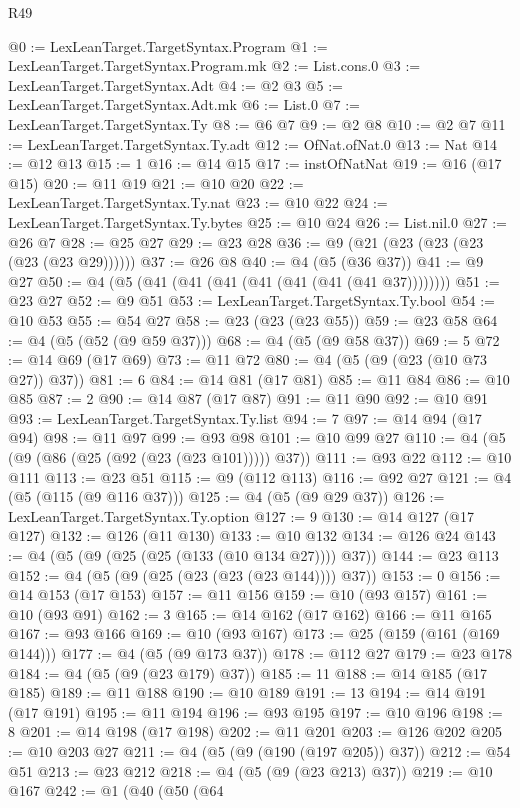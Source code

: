 \begin{lexlean}{R49}
\begin{coremodule}
@0 := LexLeanTarget.TargetSyntax.Program
@1 := LexLeanTarget.TargetSyntax.Program.mk
@2 := List.cons.{0}
@3 := LexLeanTarget.TargetSyntax.Adt
@4 := @2 @3
@5 := LexLeanTarget.TargetSyntax.Adt.mk
@6 := List.{0}
@7 := LexLeanTarget.TargetSyntax.Ty
@8 := @6 @7
@9 := @2 @8
@10 := @2 @7
@11 := LexLeanTarget.TargetSyntax.Ty.adt
@12 := OfNat.ofNat.{0}
@13 := Nat
@14 := @12 @13
@15 := 1
@16 := @14 @15
@17 := instOfNatNat
@19 := @16 (@17 @15)
@20 := @11 @19
@21 := @10 @20
@22 := LexLeanTarget.TargetSyntax.Ty.nat
@23 := @10 @22
@24 := LexLeanTarget.TargetSyntax.Ty.bytes
@25 := @10 @24
@26 := List.nil.{0}
@27 := @26 @7
@28 := @25 @27
@29 := @23 @28
@36 := @9 (@21 (@23 (@23 (@23 (@23 (@23 @29))))))
@37 := @26 @8
@40 := @4 (@5 (@36 @37))
@41 := @9 @27
@50 := @4 (@5 (@41 (@41 (@41 (@41 (@41 (@41 (@41 @37))))))))
@51 := @23 @27
@52 := @9 @51
@53 := LexLeanTarget.TargetSyntax.Ty.bool
@54 := @10 @53
@55 := @54 @27
@58 := @23 (@23 (@23 @55))
@59 := @23 @58
@64 := @4 (@5 (@52 (@9 @59 @37)))
@68 := @4 (@5 (@9 @58 @37))
@69 := 5
@72 := @14 @69 (@17 @69)
@73 := @11 @72
@80 := @4 (@5 (@9 (@23 (@10 @73 @27)) @37))
@81 := 6
@84 := @14 @81 (@17 @81)
@85 := @11 @84
@86 := @10 @85
@87 := 2
@90 := @14 @87 (@17 @87)
@91 := @11 @90
@92 := @10 @91
@93 := LexLeanTarget.TargetSyntax.Ty.list
@94 := 7
@97 := @14 @94 (@17 @94)
@98 := @11 @97
@99 := @93 @98
@101 := @10 @99 @27
@110 := @4 (@5 (@9 (@86 (@25 (@92 (@23 (@23 @101))))) @37))
@111 := @93 @22
@112 := @10 @111
@113 := @23 @51
@115 := @9 (@112 @113)
@116 := @92 @27
@121 := @4 (@5 (@115 (@9 @116 @37)))
@125 := @4 (@5 (@9 @29 @37))
@126 := LexLeanTarget.TargetSyntax.Ty.option
@127 := 9
@130 := @14 @127 (@17 @127)
@132 := @126 (@11 @130)
@133 := @10 @132
@134 := @126 @24
@143 := @4 (@5 (@9 (@25 (@25 (@133 (@10 @134 @27)))) @37))
@144 := @23 @113
@152 := @4 (@5 (@9 (@25 (@23 (@23 (@23 @144)))) @37))
@153 := 0
@156 := @14 @153 (@17 @153)
@157 := @11 @156
@159 := @10 (@93 @157)
@161 := @10 (@93 @91)
@162 := 3
@165 := @14 @162 (@17 @162)
@166 := @11 @165
@167 := @93 @166
@169 := @10 (@93 @167)
@173 := @25 (@159 (@161 (@169 @144)))
@177 := @4 (@5 (@9 @173 @37))
@178 := @112 @27
@179 := @23 @178
@184 := @4 (@5 (@9 (@23 @179) @37))
@185 := 11
@188 := @14 @185 (@17 @185)
@189 := @11 @188
@190 := @10 @189
@191 := 13
@194 := @14 @191 (@17 @191)
@195 := @11 @194
@196 := @93 @195
@197 := @10 @196
@198 := 8
@201 := @14 @198 (@17 @198)
@202 := @11 @201
@203 := @126 @202
@205 := @10 @203 @27
@211 := @4 (@5 (@9 (@190 (@197 @205)) @37))
@212 := @54 @51
@213 := @23 @212
@218 := @4 (@5 (@9 (@23 @213) @37))
@219 := @10 @167
@242 := @1
    (@40
      (@50
        (@64

\end{coremodule}
\end{lexlean}
